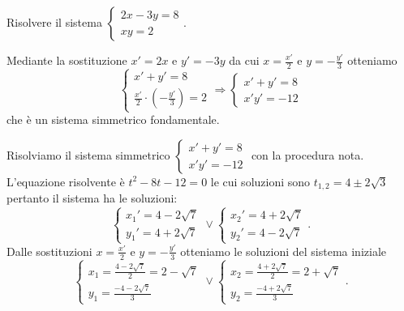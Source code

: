 \begin{esempio}{}{}
Risolvere il sistema 
\(\left\{\begin{array}{l}{2x-3y=8}\\{{xy}=2}\end{array}\right.\).

Mediante la sostituzione \(x'=2x\) e \(y'=-3y\) da cui \(x=\frac{x'} 2\) e 
\(y=-\frac{y'} 3\) otteniamo 
\[\left\{\begin{array}{l}{x'+y'=8}\\
{\frac{x'} 2\cdot \left(-\frac{y'} 3\right)=2}\end{array}\right.
\Rightarrow\left\{\begin{array}{l}{x'+y'=8}\\
{x'y'=-12}\end{array}\right.\] che è un sistema simmetrico fondamentale.

Risolviamo il sistema simmetrico 
\(\left\{\begin{array}{l}{x'+y'=8}\\{x'y'=-12}\end{array}\right.\) con la 
procedura nota. L'equazione risolvente è \(t^2-8t-12=0\) le cui soluzioni sono 
\(t_{1,2}=4\pm 2\sqrt 3\) pertanto il sistema ha le soluzioni: 
\[\left\{\begin{array}{l}{x_1'=4-2\sqrt 7}\\
{y_1'=4+2\sqrt 7}\end{array}\right.\vee 
\left\{\begin{array}{l}{x_2'=4+2\sqrt 7}\\
{y_2'=4-2\sqrt 7}\end{array}\right..\] 
Dalle sostituzioni \(x=\frac{x'} 2\) e \(y=-\frac{y'} 3\) otteniamo le soluzioni 
del sistema iniziale 
\[\left\{\begin{array}{l}{x_1=\frac{4-2\sqrt 7} 2=2-\sqrt 7}\\
{y_1=\frac{-4-2\sqrt 7} 3}\end{array}\right.\vee 
\left\{\begin{array}{l}{x_2=\frac{4+2\sqrt 7} 2=2+\sqrt 7}\\
{y_2=\frac{-4+2\sqrt 7} 3}\end{array}\right..\]

\end{esempio}

